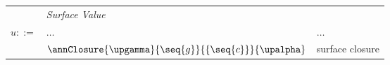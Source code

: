 \begin{figure}
   \begin{minipage}[t]{0.48\textwidth}
    \begin{tabularx}{\textwidth}{rL{2.7cm}L{3cm}}
        &\textit{Surface Value}&
    \\
    $u ::=$
    &
    $\dots$
    &
    $\dots$
    \\
    &
    $\annClosure{\upgamma}{\seq{g}}{\{\seq{c}\}}{\upalpha}$
    &
    surface closure
    \\[0mm]
        \end{tabularx}
    \end{minipage}\\[3mm]%
\end{figure}
